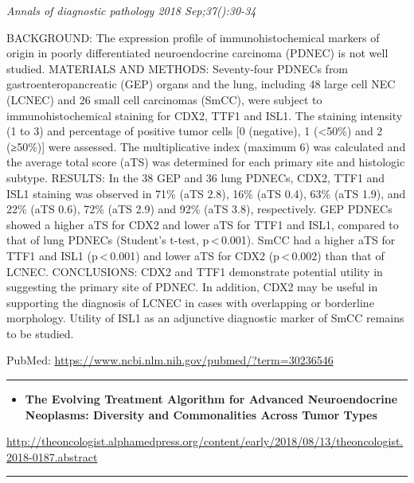 \documentclass[]{article}
\providecommand{\tightlist}{%
  \setlength{\itemsep}{0pt}\setlength{\parskip}{0pt}}
\begin{document}
\emph{Annals of diagnostic pathology 2018 Sep;37():30-34}

BACKGROUND: The expression profile of immunohistochemical markers of
origin in poorly differentiated neuroendocrine carcinoma (PDNEC) is not
well studied. MATERIALS AND METHODS: Seventy-four PDNECs from
gastroenteropancreatic (GEP) organs and the lung, including 48 large
cell NEC (LCNEC) and 26 small cell carcinomas (SmCC), were subject to
immunohistochemical staining for CDX2, TTF1 and ISL1. The staining
intensity (1 to 3) and percentage of positive tumor cells {[}0
(negative), 1 (\textless{}50\%) and 2 (≥50\%){]} were assessed. The
multiplicative index (maximum 6) was calculated and the average total
score (aTS) was determined for each primary site and histologic subtype.
RESULTS: In the 38 GEP and 36 lung PDNECs, CDX2, TTF1 and ISL1 staining
was observed in 71\% (aTS 2.8), 16\% (aTS 0.4), 63\% (aTS 1.9), and 22\%
(aTS 0.6), 72\% (aTS 2.9) and 92\% (aTS 3.8), respectively. GEP PDNECs
showed a higher aTS for CDX2 and lower aTS for TTF1 and ISL1, compared
to that of lung PDNECs (Student's t-test, p\,\textless{}\,0.001). SmCC
had a higher aTS for TTF1 and ISL1 (p\,\textless{}\,0.001) and lower aTS
for CDX2 (p\,\textless{}\,0.002) than that of LCNEC. CONCLUSIONS: CDX2
and TTF1 demonstrate potential utility in suggesting the primary site of
PDNEC. In addition, CDX2 may be useful in supporting the diagnosis of
LCNEC in cases with overlapping or borderline morphology. Utility of
ISL1 as an adjunctive diagnostic marker of SmCC remains to be studied.

PubMed: \url{https://www.ncbi.nlm.nih.gov/pubmed/?term=30236546}

{}

{}

\begin{center}\rule{0.5\linewidth}{\linethickness}\end{center}

\begin{itemize}
\tightlist
\item
  \textbf{The Evolving Treatment Algorithm for Advanced Neuroendocrine
  Neoplasms: Diversity and Commonalities Across Tumor Types}
\end{itemize}

\url{http://theoncologist.alphamedpress.org/content/early/2018/08/13/theoncologist.2018-0187.abstract}

\begin{center}\rule{0.5\linewidth}{\linethickness}\end{center}
\end{document}

